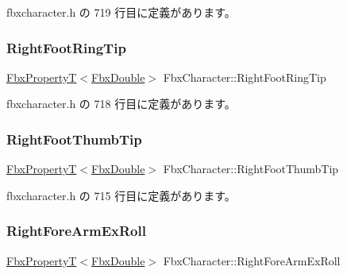  fbxcharacter.\+h の 719 行目に定義があります。

\mbox{\label{class_fbx_character_a83ea9a50a88bc42e004b7becb3df7422}} 
\subsubsection{\texorpdfstring{Right\+Foot\+Ring\+Tip}{RightFootRingTip}}
{\footnotesize\ttfamily \hyperlink{class_fbx_property_t}{Fbx\+PropertyT}$<$\hyperlink{fbxtypes_8h_a171e72a1c46fc15c1a6c9c31948c1c5b}{Fbx\+Double}$>$ Fbx\+Character\+::\+Right\+Foot\+Ring\+Tip}



 fbxcharacter.\+h の 718 行目に定義があります。

\mbox{\label{class_fbx_character_a6d1844c38937805923d4a83d6aaa8012}} 
\subsubsection{\texorpdfstring{Right\+Foot\+Thumb\+Tip}{RightFootThumbTip}}
{\footnotesize\ttfamily \hyperlink{class_fbx_property_t}{Fbx\+PropertyT}$<$\hyperlink{fbxtypes_8h_a171e72a1c46fc15c1a6c9c31948c1c5b}{Fbx\+Double}$>$ Fbx\+Character\+::\+Right\+Foot\+Thumb\+Tip}



 fbxcharacter.\+h の 715 行目に定義があります。

\mbox{\label{class_fbx_character_a7731e04aecc975db137165f0770a48b5}} 
\subsubsection{\texorpdfstring{Right\+Fore\+Arm\+Ex\+Roll}{RightForeArmExRoll}}
{\footnotesize\ttfamily \hyperlink{class_fbx_property_t}{Fbx\+PropertyT}$<$\hyperlink{fbxtypes_8h_a171e72a1c46fc15c1a6c9c31948c1c5b}{Fbx\+Double}$>$ Fbx\+Character\+::\+Right\+Fore\+Arm\+Ex\+Roll}



